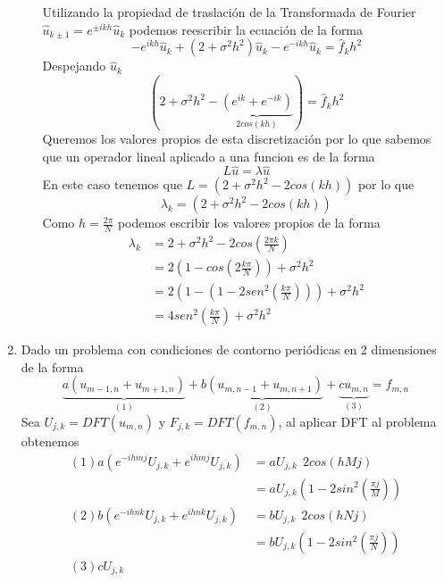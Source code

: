 \documentclass[spanish]{article}
\begin{document}
\begin{enumerate}
\begin{enumerate}
        Utilizando la propiedad de traslación de la Transformada de Fourier $\hat{u}_{k\pm1} = e^{\pm ikh} \hat{u}_k$ podemos reescribir la ecuación de la forma
        \begin{equation}
            - e^{ikh}\hat{u}_k + (2 + \sigma^2h^2) \hat{u}_k - e^{-ikh} \hat{u}_k = \hat{f}_k h^2
        \end{equation}
        Despejando $\hat{u}_k$
        \begin{equation}
           (2 + \sigma^2 h^2 - \underbrace{(e^{ik} + e^{-ik})}_{2 cos(kh)}) = \hat{f}_k h^2
        \end{equation}
        Queremos los valores propios de esta discretización por lo que sabemos que un operador lineal aplicado a una funcion es de la forma
        \begin{equation}
            L \hat{u} = \lambda \hat{u}
        \end{equation}
        En este caso tenemos que $L =  (2 + \sigma^2 h^2 -2 cos(kh))$ por lo que 
        \begin{equation}
            \lambda_k =  (2 + \sigma^2 h^2 -2 cos(kh))
        \end{equation}
        Como $h = \frac{2\pi}{N}$ podemos escribir los valores propios de la forma 
        \begin{align}
            \lambda_k &=  2 + \sigma^2 h^2 -2 cos\left(\frac{2\pi k}{N}\right) \\
             &= 2\left( 1 - cos\left(2 \frac{k\pi}{N} \right) \right) + \sigma^2 h^2 \\
             &= 2 \left( 1 - \left( 1 - 2 sen^2\left( \frac{k\pi}{N} \right) \right) \right) + \sigma^2 h^2 \\
             &= 4 sen^2\left( \frac{k \pi}{N} \right) + \sigma^2 h^2
        \end{align}
    \end{enumerate}
    
    \item Dado un problema con condiciones de contorno periódicas en 2 dimensiones de la forma 
    \begin{equation}
        \underbrace{a (u_{m-1,n} + u_{m+1,n})}_{(1)} + \underbrace{b (u_{m,n-1} + u_{m,n+1})}_{(2)} + \underbrace{c u_{m,n}}_{(3)} = f_{m,n}
    \end{equation}
    Sea  $U_{j,k} = DFT(u_{m,n})$ y $F_{j,k} = DFT(f_{m,n})$, al aplicar DFT al problema obtenemos
    \begin{align}
        (1) a \left(e^{-ihmj} U_{j,k}  + e^{ihmj} U_{j,k}\right)  &= a U_{j,k} \ \ 2 cos \left( h Mj \right)\\
        & = a U_{j,k} \left(1 - 2 sin^2\left( \frac{\pi j}{M}  \right)\right) \\
        (2) b \left(e^{-ihnk} U_{j,k}  + e^{ihnk} U_{j,k}  \right) &= b U_{j,k} \ \ 2 cos \left( h N j \right)\\
        & =  b U_{j,k} \left(1 - 2 sin^2\left( \frac{\pi j}{N}  \right)\right) \\
        (3) c U_{j,k} & 
    \end{align}
    

\end{enumerate}
\end{document}
